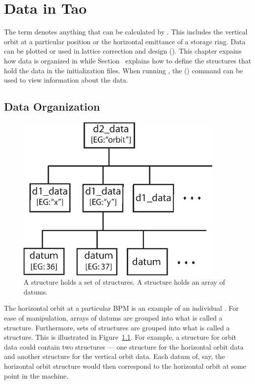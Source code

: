 \chapter{Data in Tao}
\label{c:data}

The term  denotes anything that can be calculated by
\tao. This includes the vertical orbit at a particular position or the
horizontal emittance of a storage ring. Data can be plotted or used in
lattice correction and design (). This chapter expains
how data is organized in \tao while Section~
explains how to define the structures that hold the data in the
initialization files. When running \tao, the 
() command can be used to view information about the
data.


\section{Data Organization}
\label{s:data.org}

\begin{figure}
  \centering
  \includegraphics[width=4in]{data-tree.eps}
  \caption[Data tree structure]
{A  structure holds a set of  structures. 
A  structure holds an array of datums.}
  \label{f:data.tree}
\end{figure}

The horizontal orbit at a particular BPM is an example of an
individual .  For ease of manipulation, arrays of datums are
grouped into what is called a  structure. Furthermore,
sets of  structures are grouped into what is called a
 structure.  This is illustrated in
Figure~\ref{f:data.tree}.  For example, a  structure for
orbit data could contain two  structures --- one
 structure for the horizontal orbit data and another
 structure for the vertical orbit data. Each datum of,
say, the horizontal orbit  structure would then correspond
to the horizontal orbit at some point in the machine.

